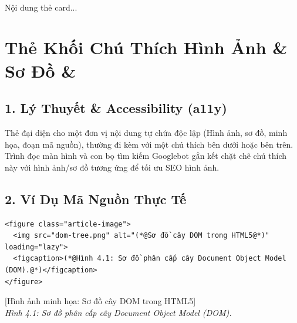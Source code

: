 \begin{browserWindow}
\sffamily\small
\begin{tcolorbox}[colback=white, colframe=gray!30, arc=4pt]
 \\[4pt]
Nội dung thẻ card...
\end{tcolorbox}
\end{browserWindow}

\section{Thẻ Khối Chú Thích Hình Ảnh \& Sơ Đồ  \& }
\subsection{1. Lý Thuyết \& Accessibility (a11y)}
Thẻ  đại diện cho một đơn vị nội dung tự chứa độc lập (Hình ảnh, sơ đồ, minh họa, đoạn mã nguồn), thường đi kèm với một chú thích  bên dưới hoặc bên trên. Trình đọc màn hình và con bọ tìm kiếm Googlebot gắn kết chặt chẽ chú thích này với hình ảnh/sơ đồ tương ứng để tối ưu SEO hình ảnh.

\subsection{2. Ví Dụ Mã Nguồn Thực Tế}
\begin{codeWindow}
\begin{lstlisting}[language=HTML5]
<figure class="article-image">
  <img src="dom-tree.png" alt="(*@Sơ đồ cây DOM trong HTML5@*)" loading="lazy">
  <figcaption>(*@Hình 4.1: Sơ đồ phân cấp cây Document Object Model (DOM).@*)</figcaption>
</figure>
\end{lstlisting}
\end{codeWindow}

\begin{browserWindow}
\sffamily\small
\begin{tcolorbox}[colback=gray!10, colframe=gray!30, width=0.85\linewidth, arc=4pt]
\centering
\textcolor{gray!80}{\small [Hình ảnh minh họa: Sơ đồ cây DOM trong HTML5]}\\[6pt]
\textit{\small Hình 4.1: Sơ đồ phân cấp cây Document Object Model (DOM).}
\end{tcolorbox}
\end{browserWindow}

